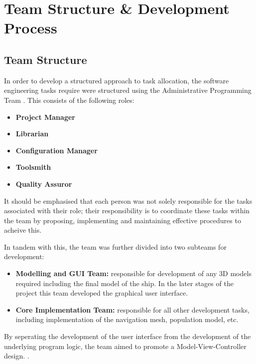 %

\section{Team Structure \& Development Process}
\subsection{Team Structure}
In order to develop a structured approach to task allocation, the software engineering tasks require were structured using the Administrative Programming Team \cite{AdministrativeProgrammingTeam}. This consists of the following roles:
\begin{itemize}
\item{\textbf{Project Manager} }
\item{\textbf{Librarian} }
\item{\textbf{Configuration Manager} }
\item{\textbf{Toolsmith} }
\item{\textbf{Quality Assuror}}
\end{itemize}

It should be emphasised that each person was not solely responsible for the tasks associated with their role; their responsibility is to coordinate these tasks within the team by proposing, implementing and maintaining effective procedures to acheive this.

In tandem with this, the team was further divided into two subteams for development:
\begin{itemize}
\item \textbf{Modelling and GUI Team:} responsible for development of any 3D models required including the final model of the ship. In the later stages of the project this team developed the graphical user interface.
\item \textbf{Core Implementation Team:} responsible for all other development tasks, including implementation of the navigation mesh, population model, etc.
\end{itemize}

By seperating the development of the user interface from the development of the underlying program logic, the team aimed to promote a Model-View-Controller design. \cite[Ch 6.3.1]{SommervilleSoftwareEng}.
  
